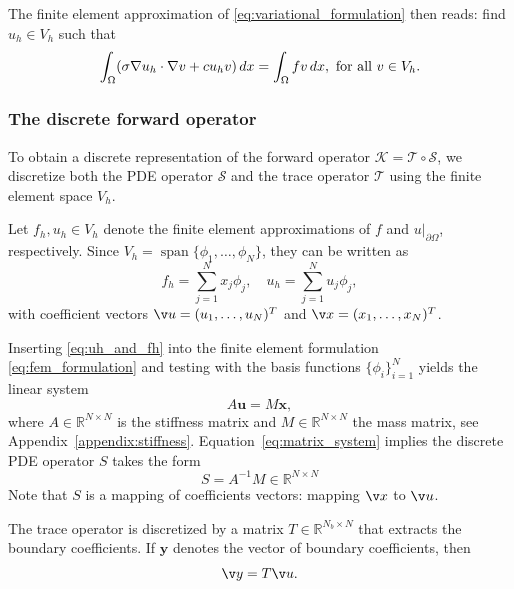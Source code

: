 
The finite element approximation of \eqref{eq:variational_formulation} then reads: 
find $u_h \in V_h$ such that
 \begin{equation}\label{eq:fem_formulation}
    \int_{\Omega} (\sigma \nabla u_h \cdot \nabla v + c u_h v) \, dx = \int_{\Omega} f v \space \, dx,
    \text{ for all } v \in V_h.
\end{equation}


\subsubsection{The discrete forward operator}
To obtain a discrete representation of the forward operator 
$\mathcal{K} = \mathcal{T} \circ \mathcal{S}$, 
we discretize both the PDE operator $\mathcal{S}$ and the trace operator $\mathcal{T}$ using the finite element space $V_h$.

Let $f_h, u_h \in V_h$ denote the finite element approximations of $f$ and $u|_{\partial\Omega}$, respectively. Since $V_h = \operatorname{span}\{\phi_1,\dots,\phi_N\}$, they can be written as
\begin{equation}\label{eq:uh_and_fh}
    f_h = \sum_{j=1}^{N} x_j \phi_j, \quad
    u_h = \sum_{j=1}^{N} u_j \phi_j, 
\end{equation}
with coefficient vectors $\v u = (u_1,\dots,u_N)^T$ 
and $\v x = (x_1,\dots,x_N)^T$.

Inserting \eqref{eq:uh_and_fh} into the finite element formulation \eqref{eq:fem_formulation} and testing with the basis functions 
$\{\phi_i\}_{i=1}^N$ yields the linear system
\begin{equation}\label{eq:matrix_system}
    A \mathbf{u} = M \mathbf{x},
\end{equation}
where $A \in \mathbb{R}^{N \times N}$ is the stiffness matrix and $M \in \mathbb{R}^{N \times N}$ the mass matrix, see Appendix~\ref{appendix:stiffness}.
%
Equation~\eqref{eq:matrix_system} implies the discrete PDE operator $S$ takes the form
\begin{equation}
    S = A^{-1} M \in \mathbb{R}^{N \times N}
\end{equation}
Note that $S$ is a mapping of coefficients vectors: mapping $\v x$ to $\v u$.

The trace operator is discretized by a matrix 
$T \in \mathbb{R}^{N_b \times N}$ that extracts the boundary coefficients. If $\mathbf{y}$ denotes the vector of boundary coefficients, then
\begin{equation}
    \v y = T \v u.
\end{equation}

